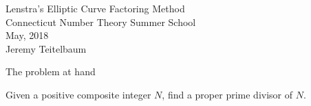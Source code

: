 \documentclass{beamer}
\begin{document}
\begin{frame}
	\begin{center}
		Lenstra's Elliptic Curve Factoring Method \\
		Connecticut Number Theory Summer School \\
		May, 2018 \\
		\bigskip
		Jeremy Teitelbaum
	\end{center}
\end{frame}
\begin{frame}{The problem at hand}
	\begin{problem} Given a positive composite integer $N$, find a proper prime divisor of $N$.
	\end{problem}
\end{frame}
%
%	
%	
%			
	
\end{document}
